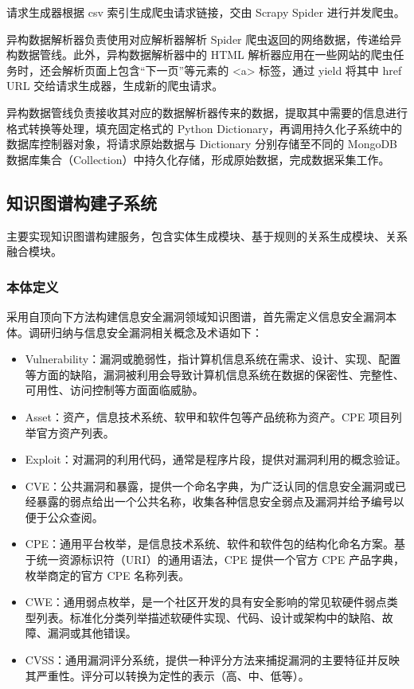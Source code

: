 \documentclass[a4paper,AutoFakeBold,oneside,12pt]{book}
\begin{document}
请求生成器根据 csv 索引生成爬虫请求链接，交由 Scrapy Spider 进行并发爬虫。

异构数据解析器负责使用对应解析器解析 Spider 爬虫返回的网络数据，传递给异构数据管线。此外，异构数据解析器中的 HTML 解析器应用在一些网站的爬虫任务时，还会解析页面上包含“下一页”等元素的 <a> 标签，通过 yield 将其中 href URL 交给请求生成器，生成新的爬虫请求。

异构数据管线负责接收其对应的数据解析器传来的数据，提取其中需要的信息进行格式转换等处理，填充固定格式的 Python Dictionary，再调用持久化子系统中的数据库控制器对象，将请求原始数据与 Dictionary 分别存储至不同的 MongoDB 数据库集合（Collection）中持久化存储，形成原始数据，完成数据采集工作。

\subsection{知识图谱构建子系统\label{知识图谱构建子系统}}

主要实现知识图谱构建服务，包含实体生成模块、基于规则的关系生成模块、关系融合模块。

\subsubsection{本体定义\label{本体定义}}

采用自顶向下方法构建信息安全漏洞领域知识图谱，首先需定义信息安全漏洞本体。调研归纳与信息安全漏洞相关概念及术语如下：
\begin{itemize}
	\item Vulnerability：漏洞或脆弱性，指计算机信息系统在需求、设计、实现、配置等方面的缺陷，漏洞被利用会导致计算机信息系统在数据的保密性、完整性、可用性、访问控制等方面面临威胁。\cite{cnnvd_vul_category}
	\item Asset：资产，信息技术系统、软甲和软件包等产品统称为资产。CPE 项目列举官方资产列表。
	\item Exploit：对漏洞的利用代码，通常是程序片段，提供对漏洞利用的概念验证。
	\item CVE：公共漏洞和暴露，提供一个命名字典，为广泛认同的信息安全漏洞或已经暴露的弱点给出一个公共名称，收集各种信息安全弱点及漏洞并给予编号以便于公众查阅。\cite{cve_intro}
	\item CPE：通用平台枚举，是信息技术系统、软件和软件包的结构化命名方案。基于统一资源标识符（URI）的通用语法，CPE 提供一个官方 CPE 产品字典，枚举商定的官方 CPE 名称列表。\cite{cpe_intro}
	\item CWE：通用弱点枚举，是一个社区开发的具有安全影响的常见软硬件弱点类型列表。标准化分类列举描述软硬件实现、代码、设计或架构中的缺陷、故障、漏洞或其他错误。\cite{cwe_intro}
	\item CVSS：通用漏洞评分系统，提供一种评分方法来捕捉漏洞的主要特征并反映其严重性。评分可以转换为定性的表示（高、中、低等）。\cite{cvss_intro}
\end{itemize}
\end{document}
